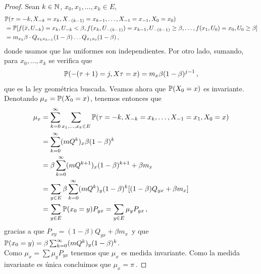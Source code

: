 \begin{proof} %
\gris
Sean $k\in\N$, $x_0,x_1,\dots,x_k\in E$,
\begin{alignat*}{2}
    & \P(\tau = -k,X_{-k}=x_k,X_{-(k-1)}=x_{k-1},\dots,X_{-1}=x_{-1},X_0=x_0) \\ & = \P[f(\bar{x},U_{-k})=x_k,U_{-k}<\beta,f(x_k,U_{-(k-1)})=x_{k-1},U_{-(k-1)}\geq\beta,\dots,f(x_{1},U_0)=x_0,U_0\geq\beta] \\
    & = m_{x_k}\beta\cdot Q_{x_k x_{k-1}}(1-\beta)\dots Q_{x_1 x_0}(1-\beta) \, ,
\end{alignat*}
donde usamos que las uniformes son independientes.
Por otro lado, sumando, para $x_0,\dots,x_k$ se verifica que
$$ \P(-(\tau+1)=j,X\tau=x)=m_x\beta(1-\beta)^{j-1} \, ,$$
que es la ley geométrica buscada. Veamos ahora que $\P(X_0=x)$ es invariante.
\\ Denotando $\mu_x=\P(X_0=x)$, tenemos entonces que 
\begin{alignat*}{2}
    \mu_x & = \displaystyle \sum^\infty_{k=0}\sum_{x_1,\dots,x_k\in E}\P(\tau=-k,X_{-k}=x_k,\dots,X_{-1}=x_1,X_0=x) \\
    & = \sum_{k=0}^\infty(mQ^k)_x\beta(1-\beta)^k \\
    & = \beta\sum^\infty_{k=0}(mQ^{k+1})_x(1-\beta)^{k+1}+\beta m_x \\
    & = \sum_{y\in E}\beta\sum^\infty_{k=0}(mQ^{k})_y(1-\beta)^{k}[(1-\beta)Q_{yx}+\beta m_x] \\
    & = \sum_{y\in E}\P(x_0=y)P_{yx} = \sum_{y\in E}\mu_y P_{yx}\,,
\end{alignat*}
gracias a que $P_{xy}=(1-\beta)Q_{yx}+\beta m_x$\, y que $\P(x_0=y)=\beta\sum^\infty_{k=0}(mQ^{k})_y(1-\beta)^{k}$. \\ Como
$ \mu_x = \displaystyle\sum \mu_yP_{yx}$
tenemos que $\mu_x$ es medida invariante. Como la medida invariante es única concluimos que $\mu_x=\pi\, .$ \findem
\negro
\end{proof}

